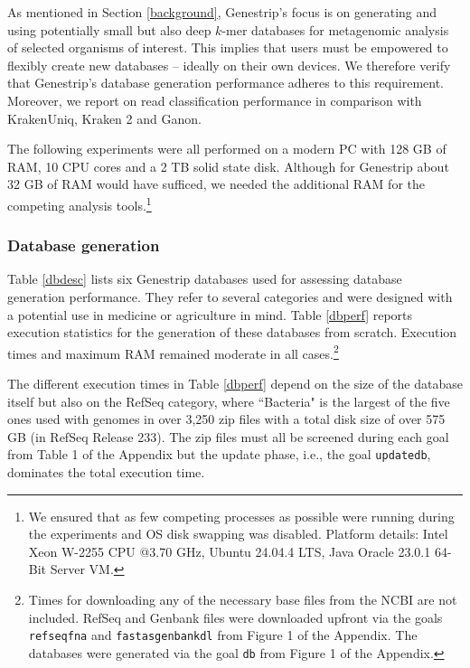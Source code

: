 \documentclass[pdflatex,sn-vancouver-num]{sn-jnl}
\begin{document}
    As mentioned in Section \ref{background}, Genestrip's focus is on generating and using potentially small but also deep $k$-mer databases for metagenomic analysis of selected organisms of interest. This implies that users must be empowered to flexibly create new databases -- ideally on their own devices. We therefore verify that Genestrip's database generation performance adheres to this requirement. Moreover, we report on read classification performance in comparison with KrakenUniq, Kraken 2 and Ganon.

  The following experiments were all performed on a modern PC with 128 GB of RAM, 10 CPU cores and a 2 TB solid state disk. Although for Genestrip about 32 GB of RAM would have sufficed, we needed the additional RAM for the competing analysis tools.\footnote{We ensured that as few competing processes as possible were running during the experiments and OS disk swapping was disabled. Platform details: Intel Xeon W-2255 CPU @3.70 GHz, Ubuntu 24.04.4 LTS, Java Oracle 23.0.1 64-Bit Server VM.}

    \subsubsection{Database generation}
    \label{genperformance}

    Table \ref{dbdesc} lists six Genestrip databases used for assessing database generation performance. They refer to several categories and were designed with a potential use in medicine or agriculture in mind. Table \ref{dbperf} reports execution statistics for the generation of these databases from scratch. Execution times and maximum RAM remained moderate in all cases.\footnote{Times for downloading any of the necessary base files from the NCBI are not included. RefSeq and Genbank files were downloaded upfront via the goals \texttt{refseqfna} and \texttt{fastasgenbankdl} from Figure 1 %
     of the Appendix. The databases were generated via the goal \texttt{db} from Figure 1 %
      of the Appendix.}

    The different execution times in Table \ref{dbperf} depend on the size of the database itself but also on the RefSeq category, where ``Bacteria" is the largest of the five ones used with genomes in over 3,250 zip files with a total disk size of over 575 GB (in RefSeq Release 233).
    The zip files must all be screened during each goal from Table 1 %
    of the Appendix but the update phase, i.e., the goal \texttt{updatedb}, dominates the total execution time.
\end{document}
